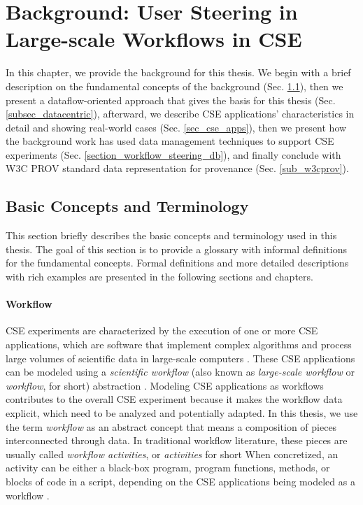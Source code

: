 \chapter{Background: User Steering in Large-scale Workflows in CSE}
\label{chap2}


In this chapter, we provide the background for this thesis.
We begin with a brief description on the fundamental concepts
of the background (Sec. \ref{chap2_sec_basic_concepts}),
then we present a dataflow-oriented approach that gives
the basis for this thesis (Sec. \ref{subsec_datacentric}),
afterward, we describe CSE applications' characteristics in detail and showing real-world cases (Sec. \ref{sec_cse_apps}), then we present how the background work
has used data management techniques to support CSE experiments (Sec. \ref{section_workflow_steering_db}), and finally conclude with W3C PROV standard data representation for provenance (Sec. \ref{sub_w3cprov}).


\section{Basic Concepts and Terminology}
\label{chap2_sec_basic_concepts}

This section briefly describes the basic concepts and terminology used in this thesis. The goal of this section is to provide a glossary with informal definitions for the fundamental concepts. Formal definitions and more detailed descriptions with rich examples are presented in the following sections and chapters.

\subsubsection{Workflow}

CSE experiments are characterized by the execution of one or more CSE applications, which are software that implement complex algorithms and process large volumes of scientific data in large-scale computers \cite{Rude2016Research}.
These CSE applications can be modeled using a \textit{scientific workflow} (also known as \textit{large-scale workflow} or \textit{workflow}, for short) abstraction
\cite{Bernholdt2017Improving, Bauer2016In, F.daSilva2017characterization}.
Modeling CSE applications as workflows contributes to the overall CSE experiment because it makes the workflow data explicit, which need 
to be analyzed and potentially adapted.
In this thesis, we use the term \textit{workflow} as an abstract concept that means a composition of pieces interconnected through data. In traditional workflow literature, these pieces are usually called \textit{workflow activities}, or \textit{activities} for short  
When concretized, an activity can be either a black-box program, program functions, methods, or blocks of code in a script, depending on the CSE applications being modeled as a workflow \cite{F.daSilva2017characterization, Silva2017Raw, Souza2017Data, Ikeda2013Logical}.

